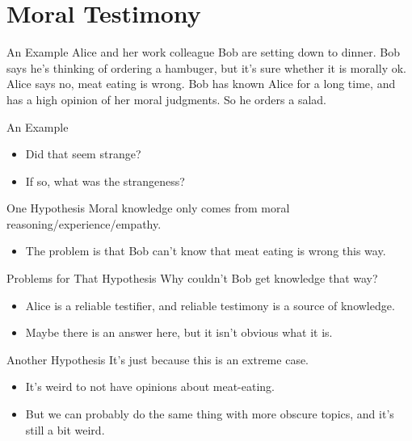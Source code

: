 \documentclass[
  17pt,
  letterpaper,
  ignorenonframetext,
  aspectratio=169,
]{beamer}
\providecommand{\tightlist}{%
  \setlength{\itemsep}{0pt}\setlength{\parskip}{0pt}}\usepackage{longtable,booktabs,array}
\begin{document}
\hypertarget{moral-testimony}{%
\section{Moral Testimony}\label{moral-testimony}}

\begin{frame}{An Example}
\protect\hypertarget{an-example}{}
Alice and her work colleague Bob are setting down to dinner. Bob says
he's thinking of ordering a hambuger, but it's sure whether it is
morally ok. Alice says no, meat eating is wrong. Bob has known Alice for
a long time, and has a high opinion of her moral judgments. So he orders
a salad.
\end{frame}

\begin{frame}{An Example}
\protect\hypertarget{an-example-1}{}
\begin{itemize}[<+->]
\tightlist
\item
  Did that seem strange?
\item
  If so, what was the strangeness?
\end{itemize}
\end{frame}

\begin{frame}{One Hypothesis}
\protect\hypertarget{one-hypothesis}{}
Moral knowledge only comes from moral reasoning/experience/empathy.

\begin{itemize}[<+->]
\tightlist
\item
  The problem is that Bob can't know that meat eating is wrong this way.
\end{itemize}
\end{frame}

\begin{frame}{Problems for That Hypothesis}
\protect\hypertarget{problems-for-that-hypothesis}{}
Why couldn't Bob get knowledge that way?

\begin{itemize}[<+->]
\tightlist
\item
  Alice is a reliable testifier, and reliable testimony is a source of
  knowledge.
\item
  Maybe there is an answer here, but it isn't obvious what it is.
\end{itemize}
\end{frame}

\begin{frame}{Another Hypothesis}
\protect\hypertarget{another-hypothesis}{}
It's just because this is an extreme case.

\begin{itemize}[<+->]
\tightlist
\item
  It's weird to not have opinions about meat-eating.
\item
  But we can probably do the same thing with more obscure topics, and
  it's still a bit weird.
\end{itemize}
\end{frame}
\end{document}

